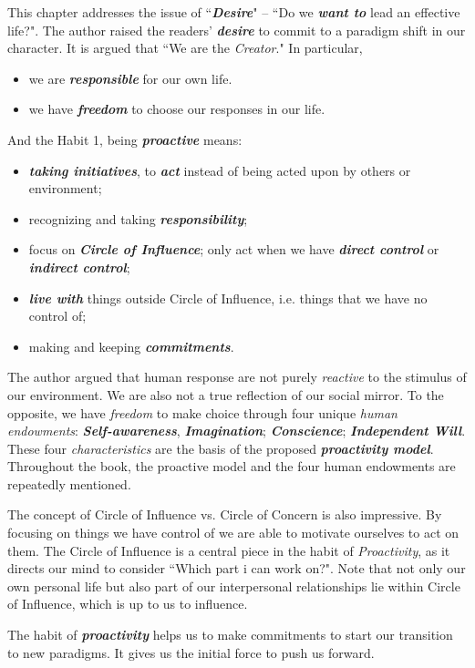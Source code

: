 \documentclass[11pt]{article}
\begin{document}
\begin{enumerate}
\begin{enumerate}
This chapter addresses the issue of ``\emph{\textbf{Desire}}" -- ``Do we \emph{\textbf{want to}} lead an effective life?". The author raised the readers' \emph{\textbf{desire}} to commit to a paradigm shift in our character. It is argued that ``We are the \emph{Creator}." In particular, 
\begin{itemize}
\item we are \emph{\textbf{responsible}} for our own life.
\item we have \emph{\textbf{freedom}} to choose our responses in our life.
\end{itemize} And the Habit 1, being \emph{\textbf{proactive}} means:
\begin{itemize}
\item \emph{\textbf{taking initiatives}}, to \emph{\textbf{act}} instead of being acted upon by others or environment;
\item recognizing and taking \emph{\textbf{responsibility}};
\item focus on \emph{\textbf{Circle of Influence}}; only act when we have \emph{\textbf{direct control}} or \emph{\textbf{indirect control}};
\item \emph{\textbf{live with}} things outside Circle of Influence, i.e. things that we have no control of;
\item making and keeping \emph{\textbf{commitments}}.
\end{itemize} The author argued that human response are not purely \emph{reactive} to the stimulus of our environment. We are also not a true reflection of our social mirror. To the opposite, we have \emph{freedom} to make choice through four unique \emph{human endowments}:  \textbf{\emph{Self-awareness}},  \emph{\textbf{Imagination}}; \emph{\textbf{Conscience}}; \emph{\textbf{Independent Will}}.  These four \emph{characteristics} are the basis of the proposed \emph{\textbf{proactivity model}}. Throughout the book, the proactive model and the four human endowments are repeatedly mentioned. 

The concept of Circle of Influence vs. Circle of Concern is also impressive. By focusing on things we have control of we are able to motivate ourselves to act on them. The Circle of Influence is a central piece in the habit of \emph{Proactivity}, as it directs our mind to consider ``Which part i can work on?". Note that not only our own personal life but also part of our interpersonal relationships lie within Circle of Influence, which is up to us to influence.

The habit of \emph{\textbf{proactivity}} helps us to make commitments to start our transition to new paradigms. It gives us the initial force to push us forward.


\end{enumerate}
\end{enumerate}
\end{document}
